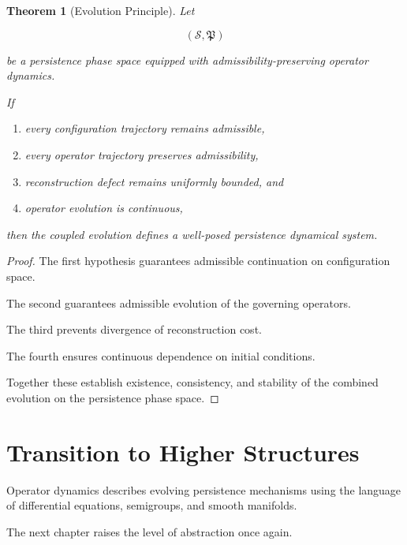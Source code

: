 \documentclass[11pt]{book}
\numberwithin{equation}{chapter}
\theoremstyle{definition}
\theoremstyle{plain}
\newtheorem{theorem}[definition]{Theorem}
\begin{document}
\begin{theorem}[Evolution Principle]

Let

\[
(\mathcal S,\mathfrak P)
\]

be a persistence phase space equipped with admissibility-preserving
operator dynamics.

If

\begin{enumerate}

\item every configuration trajectory remains admissible,

\item every operator trajectory preserves admissibility,

\item reconstruction defect remains uniformly bounded, and

\item operator evolution is continuous,

\end{enumerate}

then the coupled evolution defines a well-posed persistence dynamical
system.

\end{theorem}

\begin{proof}

The first hypothesis guarantees admissible continuation on
configuration space.

The second guarantees admissible evolution of the governing operators.

The third prevents divergence of reconstruction cost.

The fourth ensures continuous dependence on initial conditions.

Together these establish existence, consistency, and stability of the
combined evolution on the persistence phase space.

\end{proof}

\section{Transition to Higher Structures}

Operator dynamics describes evolving persistence mechanisms using the
language of differential equations, semigroups, and smooth manifolds.

The next chapter raises the level of abstraction once again.
\end{document}
